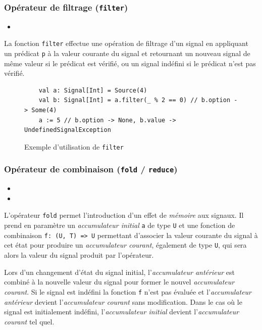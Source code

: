 \subsubsection{Opérateur de filtrage (\texttt{filter})}

\begin{itemize}
	\item {}
\end{itemize}

La fonction \texttt{filter} effectue une opération de filtrage d'un signal en appliquant un prédicat \texttt{p} à la valeur courante du signal et retournant un nouveau signal de même valeur si le prédicat est vérifié, ou un signal indéfini si le prédicat n'est pas vérifié.

\begin{figure}[h]
	\begin{lstlisting}
	val a: Signal[Int] = Source(4)
	val b: Signal[Int] = a.filter(_ % 2 == 0) // b.option -> Some(4)
	a := 5 // b.option -> None, b.value -> UndefinedSignalException
	\end{lstlisting}
	\caption{Exemple d'utilisation de \texttt{filter}}
\end{figure}

\subsubsection{Opérateur de combinaison (\texttt{fold} / \texttt{reduce})} \label{sec:sig-op-fold}

\begin{itemize}
	\item {}
	\item {}
\end{itemize}

L'opérateur \texttt{fold} permet l'introduction d'un effet de \emph{mémoire} aux signaux. Il prend en paramètre un \emph{accumulateur initial} \texttt{a} de type \texttt{U} et une fonction de combinaison \texttt{f: (U, T) => U} permettant d'associer la valeur courante du signal à cet état pour produire un \emph{accumulateur courant}, également de type \texttt{U}, qui sera alors la valeur du signal produit par l'opérateur.

Lors d'un changement d'état du signal initial, l'\emph{accumulateur antérieur} est combiné à la nouvelle valeur du signal pour former le nouvel \emph{accumulateur courant}. Si le signal est indéfini la fonction \texttt{f} n'est pas évaluée et l'\emph{accumulateur antérieur} devient l'\emph{accumulateur courant} sans modification. Dans le cas où le signal est initialement indéfini, l'\emph{accumulateur initial} devient l'\emph{accumulateur courant} tel quel.

